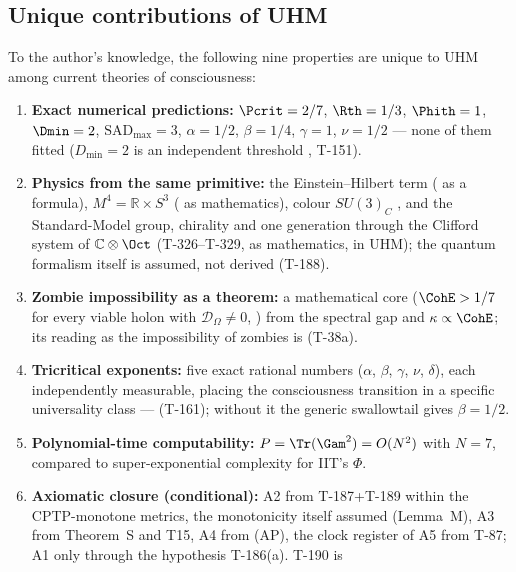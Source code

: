 \subsection{Unique contributions of UHM}

To the author's knowledge, the following nine properties are unique to UHM
among current theories of consciousness:

\begin{enumerate}[leftmargin=2em]
  \item \textbf{Exact numerical predictions:} $\Pcrit = 2/7$, $\Rth = 1/3$,
        $\Phith = 1$, $\Dmin = 2$, $\mathrm{SAD}_{\max} = 3$, $\alpha = 1/2$,
        $\beta = 1/4$, $\gamma = 1$, $\nu = 1/2$ --- none of them fitted
        ($D_{\min} = 2$ is an independent threshold , T-151).
  \item \textbf{Physics from the same primitive:} the Einstein--Hilbert term
        ( as a formula), $M^4 = \mathbb{R}\times S^3$ ( as
        mathematics), colour $SU(3)_C$ , and the Standard-Model group,
        chirality and one generation through the Clifford system of
        $\mathbb{C}\otimes\Oct$ (T-326--T-329,  as mathematics,
         in UHM); the quantum formalism itself is assumed,
        not derived (T-188).
  \item \textbf{Zombie impossibility as a theorem:} a mathematical core
        ($\CohE > 1/7$ for every viable holon with $\mathcal{D}_\Omega \neq 0$,
        ) from the spectral gap and $\kappa \propto \CohE$; its reading
        as the impossibility of zombies is  (T-38a).
  \item \textbf{Tricritical exponents:} five exact rational numbers ($\alpha$, $\beta$,
        $\gamma$, $\nu$, $\delta$), each independently measurable, placing the consciousness
        transition in a specific universality class ---  (T-161); without it the generic swallowtail gives
        $\beta = 1/2$.
  \item \textbf{Polynomial-time computability:} $P = \Tr(\Gam^2) = O(N^2)$ with $N = 7$,
        compared to super-exponential complexity for IIT's $\Phi$.
  \item \textbf{Axiomatic closure (conditional):} A2 from T-187+T-189
         within the CPTP-monotone metrics, the monotonicity itself
        assumed (Lemma~M), A3 from Theorem~S and T15, A4 from (AP), the clock register
        of A5 from T-87; A1 only through the hypothesis T-186(a). T-190 is

\end{enumerate}
